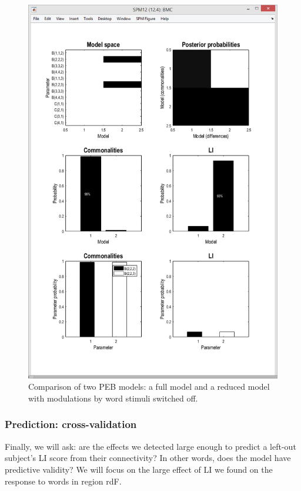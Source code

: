 \documentclass{article}
\begin{document}
\begin{figure}[ht]
\begin{center}
\includegraphics{"Fig_peb_2model_bmc"}
\caption{Comparison of two PEB models: a full model and a reduced model with modulations by word stimuli switched off.\label{Fig_peb_2model_bmc}}
\end{center}
\end{figure}

\subsubsection{Prediction: cross-validation} \label{GUI_LOO}

Finally, we will ask: are the effects we detected large enough to predict a left-out subject's LI score from their connectivity? In other words, does the model have predictive validity? We will focus on the large effect of LI we found on the response to words in region rdF.
\end{document}
